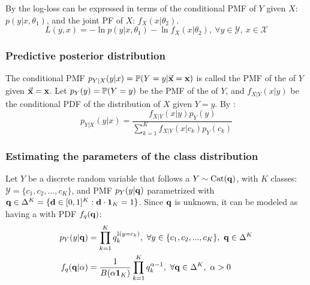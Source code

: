 By  the log-loss can be expressed in terms of the conditional PMF of $Y$ given $X$: $p(y|x,\theta_1)$, and the joint PF of $X$: $f_X(x|\theta_2)$.
\begin{equation*}
    L(y,x) = -\ln p(y|x,\theta_1)-\ln f_X(x|\theta_2),\ \forall y\in\mathcal{Y},\ x\in\mathcal{X}
\end{equation*}











\subsubsection{Predictive posterior distribution}

The conditional PMF $p_{Y|X}(y|x)=\operatorname{\mathbb{P}}(Y=y|\va{x}=\vb{x})$ is called the PMF of the  of $Y$ given $\va{x}=\vb{x}$. Let $p_Y(y)=\operatorname{\mathbb{P}}(Y=y)$ be the PMF of the  of $Y$, and $f_{X|Y}(x|y)$ be the conditional PDF of the distribution of $X$ given $Y=y$. By :
\begin{equation*}
    p_{Y|X}(y|x)= \frac{f_{X|Y}(x|y)p_Y(y)}{\sum_{k=1}^Kf_{X|Y}(x|c_k)p_Y(c_k)}
\end{equation*}

\subsubsection{Estimating the parameters of the class distribution}



Let $Y$ be a discrete random variable that follows a 
 $Y\sim\textrm{Cat}(\vb{q})$, with $K$ classes: $\mathcal{Y} =\{c_1,c_2,...,c_K\}$, and PMF $p_Y(y|\vb{q})$ parametrized with $\vb{q}\in \Delta^K = \{\vb{d}\in[0,1]^K: \vb{d}\cdot\vb{1}_K=1 \}$. Since $\vb{q}$ is unknown, it can be modeled as having a   with PDF $f_q(\vb{q})$: 
\begin{align*}
    p_Y(y|\vb{q}) & =\prod_{k=1}^Kq_{k}^{\operatorname{\mathbb{I}}(y=c_k)}, \ \forall y\in\{c_1,c_2,...,c_K\},\ \vb{q}\in \Delta^K \\
    f_q(\vb{q}|\alpha) &= \frac{1}{B(\alpha\vb{1}_K)}\prod_{k=1}^Kq_{k}^{\alpha-1},\ \forall \vb{q}\in \Delta^K,\ \alpha>0
\end{align*}


